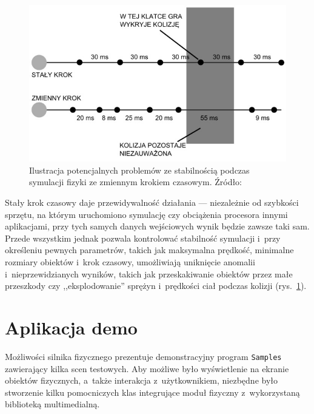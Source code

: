 \begin{figure}[h!]
	\centering
	\includegraphics[width=0.7\linewidth]{images/niewykrycie-kolizji}
	\caption[Ilustracja potencjalnych problemów ze stabilnością podczas symulacji fizyki ze zmiennym krokiem czasowym.]{Ilustracja potencjalnych problemów ze stabilnością podczas symulacji fizyki ze zmiennym krokiem czasowym. Źródło: \cite{bib:temporal}}
	\label{fig:niewykrycie-kolizji}
\end{figure}
\clearpage

Stały krok czasowy daje przewidywalność działania --- niezależnie od szybkości sprzętu, na którym uruchomiono symulację czy obciążenia procesora innymi aplikacjami, przy tych samych danych wejściowych wynik będzie zawsze taki sam. Przede wszystkim jednak pozwala kontrolować stabilność symulacji i~przy określeniu pewnych parametrów, takich jak maksymalna prędkość, minimalne rozmiary obiektów i~krok czasowy, umożliwiają uniknięcie anomalii i~nieprzewidzianych wyników, takich jak przeskakiwanie obiektów przez małe przeszkody czy ,,eksplodowanie'' sprężyn i~prędkości ciał podczas kolizji (rys.~\ref{fig:niewykrycie-kolizji}).



\chapter{Aplikacja demo}
Możliwości silnika fizycznego prezentuje demonstracyjny program \verb|Samples| zawierający kilka scen testowych. Aby możliwe było wyświetlenie na ekranie obiektów fizycznych, a~także interakcja z~użytkownikiem, niezbędne było stworzenie kilku pomocniczych klas integrujące moduł fizyczny z~wykorzystaną biblioteką multimedialną.

